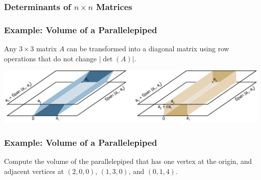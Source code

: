 \begin{frame}\frametitle{Determinants of $n\times n$ Matrices}

\begin{center}\end{center}


\end{frame}


\begin{frame}\frametitle{Example: Volume of a Parallelepiped}

    Any $3 \times  3$ matrix $ A$ can be transformed into a diagonal matrix using row operations that do not change 
    $ \lvert  \operatorname {det} (A)\rvert $. 
    
    \vspace{12pt}
    \begin{center}
    \includegraphics[width=\textwidth]{Chapter3/images/image004.jpg} 
    \end{center}

\end{frame}



\begin{frame}\frametitle{Example: Volume of a Parallelepiped}

    Compute the volume of the parallelepiped that has one vertex at the origin, and adjacent vertices at $(2,0,0)$, $(1,3,0)$, and $(0,1,4)$.  

\end{frame}










